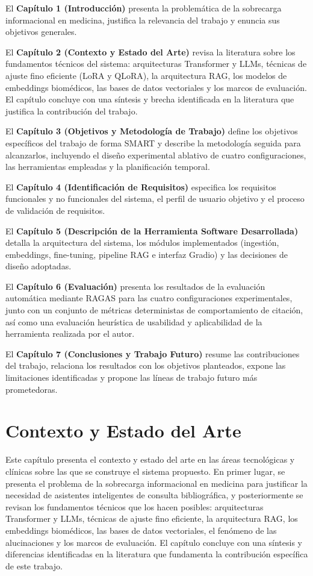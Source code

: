 \documentclass[11pt,a4paper,spanish]{book}
\numberwithin{equation}{chapter}
\numberwithin{figure}{chapter}
\begin{document}
El \textbf{Capítulo 1 (Introducción)} presenta la problemática de la sobrecarga informacional en medicina, justifica la relevancia del trabajo y enuncia sus objetivos generales.

El \textbf{Capítulo 2 (Contexto y Estado del Arte)} revisa la literatura sobre los fundamentos técnicos del sistema: arquitecturas Transformer y LLMs, técnicas de ajuste fino eficiente (LoRA y QLoRA), la arquitectura RAG, los modelos de embeddings biomédicos, las bases de datos vectoriales y los marcos de evaluación. El capítulo concluye con una síntesis y brecha identificada en la literatura que justifica la contribución del trabajo.

El \textbf{Capítulo 3 (Objetivos y Metodología de Trabajo)} define los objetivos específicos del trabajo de forma SMART y describe la metodología seguida para alcanzarlos, incluyendo el diseño experimental ablativo de cuatro configuraciones, las herramientas empleadas y la planificación temporal.

El \textbf{Capítulo 4 (Identificación de Requisitos)} especifica los requisitos funcionales y no funcionales del sistema, el perfil de usuario objetivo y el proceso de validación de requisitos.

El \textbf{Capítulo 5 (Descripción de la Herramienta Software Desarrollada)} detalla la arquitectura del sistema, los módulos implementados (ingestión, embeddings, fine-tuning, pipeline RAG e interfaz Gradio) y las decisiones de diseño adoptadas.

El \textbf{Capítulo 6 (Evaluación)} presenta los resultados de la evaluación automática mediante RAGAS para las cuatro configuraciones experimentales, junto con un conjunto de métricas deterministas de comportamiento de citación, así como una evaluación heurística de usabilidad y aplicabilidad de la herramienta realizada por el autor.

El \textbf{Capítulo 7 (Conclusiones y Trabajo Futuro)} resume las contribuciones del trabajo, relaciona los resultados con los objetivos planteados, expone las limitaciones identificadas y propone las líneas de trabajo futuro más prometedoras.

\chapter{Contexto y Estado del Arte}

Este capítulo presenta el contexto y estado del arte en las áreas tecnológicas y clínicas sobre las que se construye el sistema propuesto. En primer lugar, se presenta el problema de la sobrecarga informacional en medicina para justificar la necesidad de asistentes inteligentes de consulta bibliográfica, y posteriormente se revisan los fundamentos técnicos que los hacen posibles: arquitecturas Transformer y LLMs, técnicas de ajuste fino eficiente, la arquitectura RAG, los embeddings biomédicos, las bases de datos vectoriales, el fenómeno de las alucinaciones y los marcos de evaluación. El capítulo concluye con una síntesis y diferencias identificadas en la literatura que fundamenta la contribución específica de este trabajo.
\end{document}
